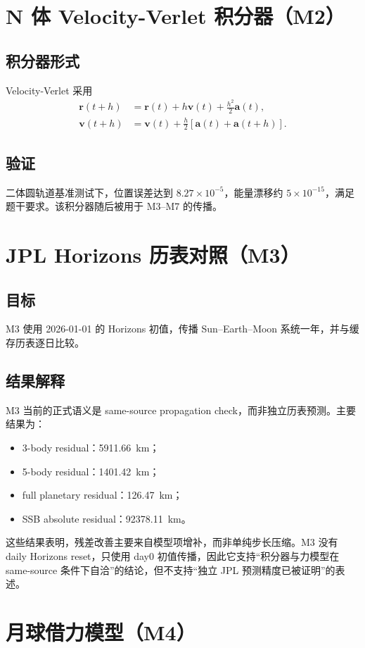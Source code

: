 \documentclass[12pt,a4paper]{ctexart}
\begin{document}
\section{N 体 Velocity-Verlet 积分器（M2）}
\subsection{积分器形式}
Velocity-Verlet 采用
\begin{align}
\bm{r}(t+h) &= \bm{r}(t) + h\bm{v}(t) + \frac{h^2}{2}\bm{a}(t), \\
\bm{v}(t+h) &= \bm{v}(t) + \frac{h}{2}\left[\bm{a}(t)+\bm{a}(t+h)\right].
\end{align}

\subsection{验证}
二体圆轨道基准测试下，位置误差达到 $8.27\times 10^{-5}$，能量漂移约 $5\times10^{-15}$，满足题干要求。该积分器随后被用于 M3--M7 的传播。

\section{JPL Horizons 历表对照（M3）}
\subsection{目标}
M3 使用 2026-01-01 的 Horizons 初值，传播 Sun--Earth--Moon 系统一年，并与缓存历表逐日比较。

\subsection{结果解释}
M3 当前的正式语义是 same-source propagation check，而非独立历表预测。主要结果为：
\begin{itemize}
    \item 3-body residual：5911.66~km；
    \item 5-body residual：1401.42~km；
    \item full planetary residual：126.47~km；
    \item SSB absolute residual：92378.11~km。
\end{itemize}
这些结果表明，残差改善主要来自模型项增补，而非单纯步长压缩。M3 没有 daily Horizons reset，只使用 day0 初值传播，因此它支持“积分器与力模型在 same-source 条件下自洽”的结论，但不支持“独立 JPL 预测精度已被证明”的表述。

\section{月球借力模型（M4）}
\end{document}
